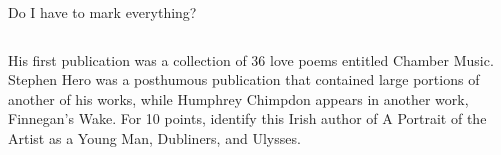 \documentclass[compress]{beamer}
\begin{document}
\begin{frame}{Do I have to mark everything?}

\begin{columns}

\alert<2,10>{His} first publication was \alert<3,10>{a collection of 36 love poems} entitled \alert<3,10>{Chamber Music}. \alert<4,10>{Stephen Hero} was a posthumous publication that contained large portions of \alert<7,10>{another of \alert<2,10>{his} works}, while \alert<5,10>{Humphrey Chimpdon} appears in another work, \alert<6,10>{Finnegan's Wake}. For 10 points, identify \alert<2,10>{this Irish author of \alert<7,10>{A Portrait of the Artist as a Young Man}, \alert<8,10>{Dubliners}, and \alert<9,10>{Ulysses}}.










\end{columns}
\end{frame}
\end{document}
